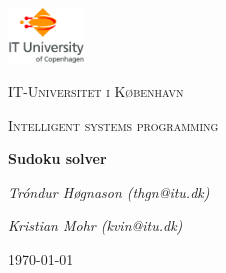 
\begin{titlepage}
	\centering
	\includegraphics[width=0.15\textwidth]{logo}\par\vspace{1cm}
	{\scshape\LARGE IT-Universitet i København \par}
	\vspace{1cm}
	{\scshape\Large Intelligent systems programming\par}
	\vspace{1.5cm}
	{\huge\bfseries Sudoku solver\par}
	\vspace{2cm}
	{\Large\itshape Tróndur Høgnason (thgn@itu.dk)\par}
	{\Large\itshape Kristian Mohr (kvin@itu.dk)\par}
	\vspace{\fill}
	{\large \today\par}
\end{titlepage}